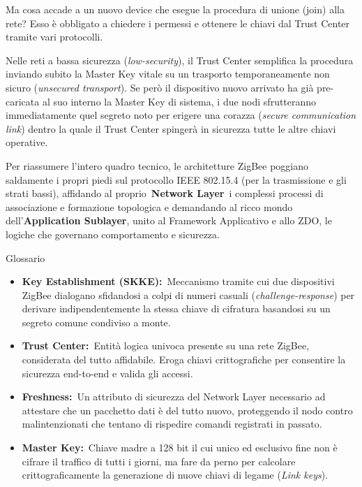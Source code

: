 \documentclass[
  italian,
  openany]{book}
\begin{document}
Ma cosa accade a un nuovo device che esegue la procedura di unione
(join) alla rete? Esso è obbligato a chiedere i permessi e ottenere le
chiavi dal Trust Center tramite vari protocolli.

Nelle reti a bassa sicurezza (\emph{low-security}), il Trust Center
semplifica la procedura inviando subito la Master Key vitale su un
trasporto temporaneamente non sicuro (\emph{unsecured transport}). Se
però il dispositivo nuovo arrivato ha già pre-caricata al suo interno la
Master Key di sistema, i due nodi sfrutteranno immediatamente quel
segreto noto per erigere una corazza (\emph{secure communication link})
dentro la quale il Trust Center spingerà in sicurezza tutte le altre
chiavi operative.

Per riassumere l'intero quadro tecnico, le architetture ZigBee poggiano
saldamente i propri piedi sul protocollo IEEE 802.15.4 (per la
trasmissione e gli strati bassi), affidando al proprio~\textbf{Network
Layer}~i complessi processi di associazione e formazione topologica e
demandando al ricco mondo dell'\textbf{Application Sublayer}, unito al
Framework Applicativo e allo ZDO, le logiche che governano comportamento
e sicurezza.

\begin{calloutnote}{Glossario}

\begin{itemize}
\item
  \textbf{Key Establishment (SKKE):}~Meccanismo tramite cui due
  dispositivi ZigBee dialogano sfidandosi a colpi di numeri casuali
  (\emph{challenge-response}) per derivare indipendentemente la stessa
  chiave di cifratura basandosi su un segreto comune condiviso a monte.
\item
  \textbf{Trust Center:}~Entità logica univoca presente su una rete
  ZigBee, considerata del tutto affidabile. Eroga chiavi crittografiche
  per consentire la sicurezza end-to-end e valida gli accessi.
\item
  \textbf{Freshness:}~Un attributo di sicurezza del Network Layer
  necessario ad attestare che un pacchetto dati è del tutto nuovo,
  proteggendo il nodo contro malintenzionati che tentano di rispedire
  comandi registrati in passato.
\item
  \textbf{Master Key:}~Chiave madre a 128 bit il cui unico ed esclusivo
  fine non è cifrare il traffico di tutti i giorni, ma fare da perno per
  calcolare crittograficamente la generazione di nuove chiavi di legame
  (\emph{Link keys}).
\end{itemize}

\end{calloutnote}
\end{document}
